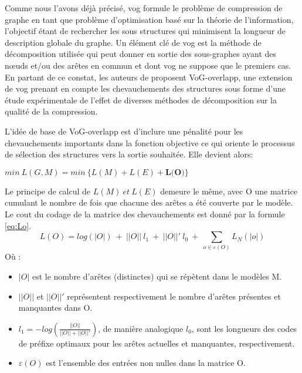 			Comme nous l'avons déjà précisé, \gls{vog} formule le problème de compression de graphe en tant que problème d'optimisation basé sur la théorie de l'information, l'objectif étant de rechercher les sous structures  qui minimisent la longueur de description globale du graphe. Un élément clé de \gls{vog} est la méthode de décomposition utilisée qui peut donner en sortie des sous-graphes ayant des nœuds et/ou des arêtes en commun et dont \gls{vog} \citep{koutra2015summarizing} ne suppose que le premiers cas. 
			En partant de ce constat, les auteurs de \citep{liu2015empirical} proposent VoG-overlapp, une extension de \gls{vog} prenant en compte les chevauchements des structures sous forme d'une étude expérimentale de l'effet de diverses méthodes de décomposition sur la qualité de la compression.
			
			L'idée de base de VoG-overlapp est d'inclure une pénalité pour les chevauchements importants dans la fonction objective ce qui oriente le processus de sélection des structures vers la sortie souhaitée. Elle devient alors:
			\begin{center}
				$min\ L(G,M) = min\ \big\{L(M) + L(E) +\textbf{L(O)}\big\}$
			\end{center}
			
			Le principe de calcul de $L(M)\ et\ L(E)$ demeure le même, avec O une matrice cumulant le nombre de fois que chacune des arêtes a été couverte par le modèle. Le cout du codage de la matrice des chevauchements est donné par la formule \eqref{eq:Lo}.
			\begin{equation} \label{eq:Lo}
				L(O) = log(|O|)\ +\ ||O||\ l_{1}\ +\ ||O||'\ l_{0}\ +\  \displaystyle{\sum_{o\in\varepsilon(O)}L_{N}(|o|)}
			\end{equation}
			Où :
			\begin{itemize}[label=$\circ$]
				\item $|O|$  est le nombre d'arêtes (distinctes) qui se répètent dans le modèles M. 
				\item $||O||$ et $||O||'$ représentent respectivement le nombre d'arêtes présentes et manquantes dans O.
				\item $l_{1} = -log (\frac{||O||}{||O||+||O||'})$, de manière analogique $l_{0}$, sont les longueurs des codes de préfixe optimaux pour les arêtes actuelles et manquantes, respectivement.
				\item $\varepsilon(O)$  est l'ensemble des entrées non nulles dans la matrice O.
			\end{itemize}